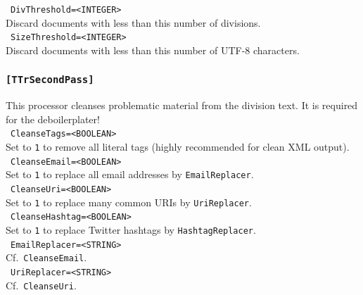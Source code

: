 \documentclass[12pt,a4paper]{article}
\begin{document}
\noindent\textbullet~\texttt{DivThreshold=<INTEGER>}\\

Discard documents with less than this number of divisions.\\

\noindent\textbullet~\texttt{SizeThreshold=<INTEGER>}\\

Discard documents with less than this number of UTF-8 characters.\\


\subsubsection{\texttt{[TTrSecondPass]}}
\label{sec:secondpass}

This processor cleanses problematic material from the division text.
It is required for the deboilerplater!\\

\noindent\textbullet~\texttt{CleanseTags=<BOOLEAN>}\\

Set to \texttt{1} to remove all literal tags (highly recommended for clean XML output).\\

\noindent\textbullet~\texttt{CleanseEmail=<BOOLEAN>}\\

Set to \texttt{1} to replace all email addresses by \texttt{EmailReplacer}.\\

\noindent\textbullet~\texttt{CleanseUri=<BOOLEAN>}\\

Set to \texttt{1} to replace many common URIs by \texttt{UriReplacer}.\\

\noindent\textbullet~\texttt{CleanseHashtag=<BOOLEAN>}\\

Set to \texttt{1} to replace Twitter hashtags by \texttt{HashtagReplacer}.\\

\noindent\textbullet~\texttt{EmailReplacer=<STRING>}\\

Cf.\ \texttt{CleanseEmail}.\\

\noindent\textbullet~\texttt{UriReplacer=<STRING>}\\

Cf.\ \texttt{CleanseUri}.\\
\end{document}
